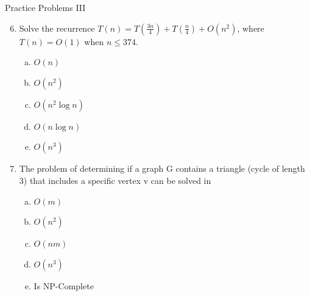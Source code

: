 \documentclass{beamer}
\begin{document}
\begin{frame}[t]{Practice Problems III}
    \begin{enumerate}
        \setcounter{enumi}{5}
        \item Solve the recurrence $T(n) = T\left(\frac{3n}{4}\right) + T\left(\frac{n}{4}\right) + O(n^2)$, where $T(n) = O(1)$ when $n \leq 374$.
            \begin{enumerate}[(a)]
                \item $O(n)$
                \item $O(n^2)$ %
                \item $O(n^2 \log n)$ 
                \item $O(n \log n)$
                \item $O(n^3)$
            \end{enumerate}
        \pause\item The problem of determining if a graph G contains a triangle (cycle of length 3) that includes a specific vertex v can be solved in
            \begin{enumerate}[(a)]
                \item $O(m)$
                \item $O(n^2)$
                \item $O(nm)$
                \item $O(n^3)$
                \item Is NP-Complete
            \end{enumerate}
    \end{enumerate}
\end{frame}
\end{document}
